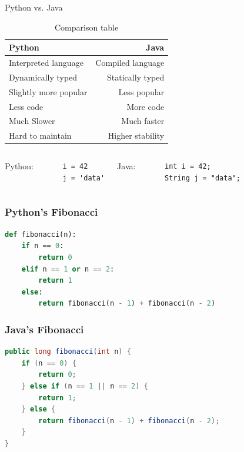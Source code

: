 \documentclass[aspectratio=169, 14pt]{beamer}
\begin{document}
\begin{frame}{Python vs. Java}
    \begin{table}
        \caption{Comparison table}
        \begin{tabular}{lr}
          \toprule
          Python & Java\\
          \midrule
          Interpreted language & Compiled language\\
          Dynamically typed & Statically typed\\
          Slightly more popular & Less popular\\
          Less code & More code\\
          Much Slower & Much faster \\
          Hard to maintain & Higher stability \\
          \bottomrule
        \end{tabular}
    \end{table}
\end{frame}

\begin{frame}[fragile]
    \begin{columns}
         Python:
\begin{verbatim}
    i = 42
    j = 'data'
\end{verbatim}
    
         Java:
\begin{verbatim}
    int i = 42;
    String j = "data";
\end{verbatim}
      \end{columns}
\end{frame}

\begin{frame}[fragile]
    \frametitle{Python's Fibonacci}
\begin{lstlisting}[language=Python]
def fibonacci(n):
    if n == 0:
        return 0
    elif n == 1 or n == 2:
        return 1
    else:
        return fibonacci(n - 1) + fibonacci(n - 2)     
\end{lstlisting}
\end{frame}

\begin{frame}[fragile]
    \frametitle{Java's Fibonacci}
\begin{lstlisting}[language=Java]
public long fibonacci(int n) {
    if (n == 0) {
        return 0;
    } else if (n == 1 || n == 2) {
        return 1;
    } else {
        return fibonacci(n - 1) + fibonacci(n - 2);
    }
}     
\end{lstlisting}
\end{frame}
\end{document}
